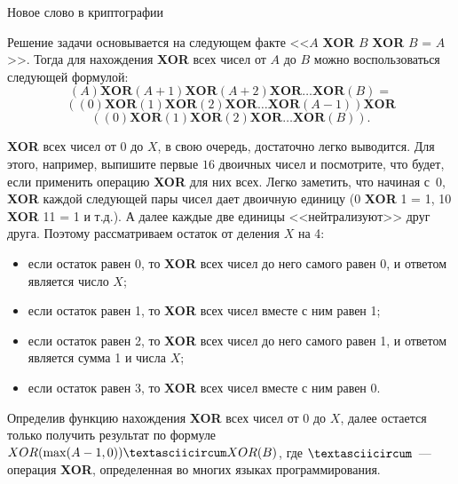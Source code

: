 \begin{tutorial}{Новое слово в криптографии}

Решение задачи основывается на следующем факте <<$A$ \textbf{XOR} $B$ \textbf{XOR} $B$ = $A$>>. Тогда для нахождения \textbf{XOR} всех чисел от $A$ до $B$ можно воспользоваться следующей формулой:
$$(A) \textbf{XOR} (A+1) \textbf{XOR} (A+2) \textbf{XOR}\ldots\textbf{XOR} (B) =$$
$$((0)\textbf{XOR}(1)\textbf{XOR}(2)\textbf{XOR}\ldots\textbf{XOR}(A-1))\textbf{XOR}$$
$$((0)\textbf{XOR}(1)\textbf{XOR}(2)\textbf{XOR}\ldots\textbf{XOR}(B)).$$

\textbf{XOR} всех чисел от $0$ до $X$, в свою очередь, достаточно легко выводится. Для этого, например, выпишите первые $16$ двоичных чисел и посмотрите, что будет, если применить операцию \textbf{XOR} для них всех. Легко заметить, что начиная с~$0$, \textbf{XOR} каждой следующей пары чисел дает двоичную единицу (0 \textbf{XOR} 1 = 1, 10 \textbf{XOR} 11 = 1 и т.д.). А далее каждые две единицы <<нейтрализуют>> друг друга. Поэтому рассматриваем остаток от деления $X$ на 4:
\begin{itemize}
  \item если остаток равен 0, то \textbf{XOR} всех чисел до него самого равен 0, и ответом является число $X$;
  \item если остаток равен 1, то \textbf{XOR} всех чисел вместе с ним равен 1;
  \item если остаток равен 2, то \textbf{XOR} всех чисел до него самого равен 1, и ответом является сумма 1 и числа $X$;
  \item если остаток равен 3, то \textbf{XOR} всех чисел вместе с ним равен 0.
\end{itemize}

Определив функцию нахождения \textbf{XOR} всех чисел от $0$ до $X$, далее остается только получить результат по формуле $XOR(\max(A-1,0)) \textasciicircum XOR(B)$, где $\textasciicircum$~--- операция \textbf{XOR}, определенная во многих языках программирования. 

\end{tutorial}

